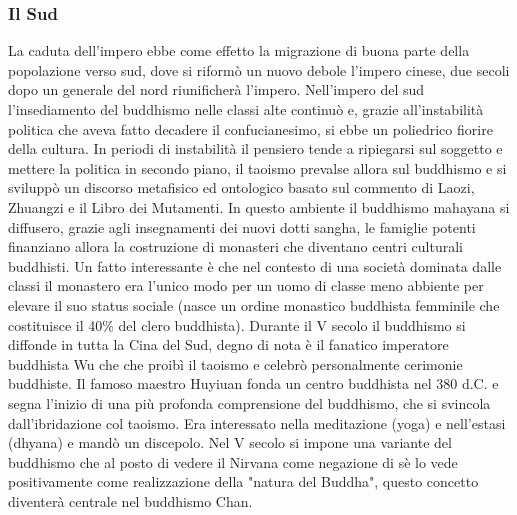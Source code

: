 \documentclass[10pt,a4paper]{report}
\begin{document}
\subsubsection{Il Sud}
La caduta dell'impero ebbe come effetto la migrazione di buona parte della popolazione verso sud, dove si riformò un nuovo debole l'impero cinese, due secoli dopo un generale del nord riunificherà l'impero. Nell'impero del sud l'insediamento del buddhismo nelle classi alte continuò e, grazie all'instabilità politica che aveva fatto decadere il confucianesimo, si ebbe un poliedrico fiorire della cultura. In periodi di instabilità il pensiero tende a ripiegarsi sul soggetto e mettere la politica in secondo piano, il taoismo prevalse allora sul buddhismo e si sviluppò un discorso metafisico ed ontologico basato sul commento di Laozi, Zhuangzi e il Libro dei Mutamenti. In questo ambiente il buddhismo mahayana si diffusero, grazie agli insegnamenti dei nuovi dotti sangha, le famiglie potenti finanziano allora la costruzione di monasteri che diventano centri culturali buddhisti. Un fatto interessante è che nel contesto di una società dominata dalle classi il monastero era l'unico modo per un uomo di classe meno abbiente per elevare il suo status sociale (nasce un ordine monastico buddhista femminile che costituisce il 40\% del clero buddhista).   Durante il V secolo il buddhismo si diffonde in tutta la Cina del Sud, degno di nota è il fanatico imperatore buddhista Wu che che proibì il taoismo e celebrò personalmente cerimonie buddhiste. Il famoso maestro Huyiuan fonda un centro buddhista nel 380 d.C. e segna l'inizio di una più profonda comprensione del buddhismo, che si svincola dall'ibridazione col taoismo. Era interessato nella meditazione (yoga) e nell'estasi (dhyana) e mandò un discepolo. Nel V secolo si impone una variante del buddhismo che al posto di vedere il Nirvana come negazione di sè lo vede positivamente come realizzazione della "natura del Buddha", questo concetto diventerà centrale nel buddhismo Chan.
\end{document}

